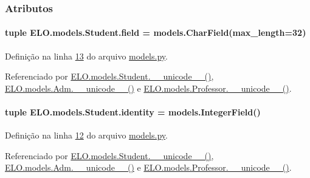 \subsubsection{Atributos}
\hypertarget{classELO_1_1models_1_1Student_a893ec9b2ece5c6b829fce5e5a7c1d576}{
\paragraph[{field}]{\setlength{\rightskip}{0pt plus 5cm}tuple E\-L\-O.\-models.\-Student.\-field = models.\-Char\-Field(max\-\_\-length=32)\hspace{0.3cm}{\ttfamily [static]}}}\label{classELO_1_1models_1_1Student_a893ec9b2ece5c6b829fce5e5a7c1d576}


Definição na linha \hyperlink{ELO_2models_8py_source_l00013}{13} do arquivo \hyperlink{ELO_2models_8py_source}{models.\-py}.



Referenciado por \hyperlink{classELO_1_1models_1_1Student_a2f51785c1beb3b45269a8678d97ec783}{E\-L\-O.\-models.\-Student.\-\_\-\-\_\-unicode\-\_\-\-\_\-()}, \hyperlink{classELO_1_1models_1_1Adm_a3541c3ae12b8d2da3f44ac6be00a23e6}{E\-L\-O.\-models.\-Adm.\-\_\-\-\_\-unicode\-\_\-\-\_\-()} e \hyperlink{classELO_1_1models_1_1Professor_aefc9d63d429e19ec3487a7879879f29d}{E\-L\-O.\-models.\-Professor.\-\_\-\-\_\-unicode\-\_\-\-\_\-()}.

\hypertarget{classELO_1_1models_1_1Student_a20a7789a2b0f5b7d0c98453dcf38bc4e}{
\paragraph[{identity}]{\setlength{\rightskip}{0pt plus 5cm}tuple E\-L\-O.\-models.\-Student.\-identity = models.\-Integer\-Field()\hspace{0.3cm}{\ttfamily [static]}}}\label{classELO_1_1models_1_1Student_a20a7789a2b0f5b7d0c98453dcf38bc4e}


Definição na linha \hyperlink{ELO_2models_8py_source_l00012}{12} do arquivo \hyperlink{ELO_2models_8py_source}{models.\-py}.



Referenciado por \hyperlink{classELO_1_1models_1_1Student_a2f51785c1beb3b45269a8678d97ec783}{E\-L\-O.\-models.\-Student.\-\_\-\-\_\-unicode\-\_\-\-\_\-()}, \hyperlink{classELO_1_1models_1_1Adm_a3541c3ae12b8d2da3f44ac6be00a23e6}{E\-L\-O.\-models.\-Adm.\-\_\-\-\_\-unicode\-\_\-\-\_\-()} e \hyperlink{classELO_1_1models_1_1Professor_aefc9d63d429e19ec3487a7879879f29d}{E\-L\-O.\-models.\-Professor.\-\_\-\-\_\-unicode\-\_\-\-\_\-()}.

